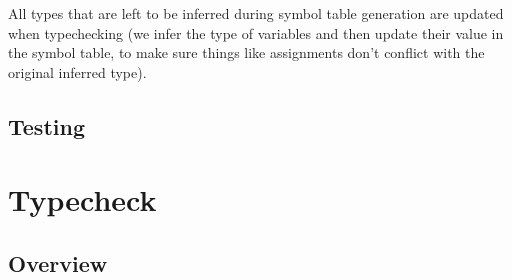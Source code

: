 \documentclass[11pt]{article}
\begin{document}
All types that are left to be inferred during symbol table generation
are updated when typechecking (we infer the type of variables and then
update their value in the symbol table, to make sure things like
assignments don't conflict with the original inferred type).

\subsection{Testing} %
\section{Typecheck}
\subsection{Overview}
\end{document}
